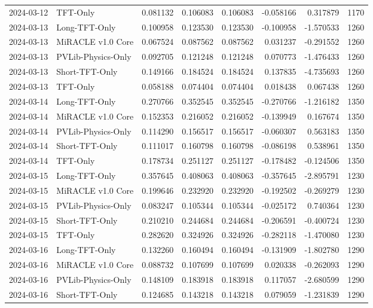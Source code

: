\begin{tabular}{llrrrrrr}
2024-03-12 & TFT-Only & 0.081132 & 0.106083 & 0.106083 & -0.058166 & 0.317879 & 1170 \\
2024-03-13 & Long-TFT-Only & 0.100958 & 0.123530 & 0.123530 & -0.100958 & -1.570533 & 1260 \\
2024-03-13 & MiRACLE v1.0 Core & 0.067524 & 0.087562 & 0.087562 & 0.031237 & -0.291552 & 1260 \\
2024-03-13 & PVLib-Physics-Only & 0.092705 & 0.121248 & 0.121248 & 0.070773 & -1.476433 & 1260 \\
2024-03-13 & Short-TFT-Only & 0.149166 & 0.184524 & 0.184524 & 0.137835 & -4.735693 & 1260 \\
2024-03-13 & TFT-Only & 0.058188 & 0.074404 & 0.074404 & 0.018438 & 0.067438 & 1260 \\
2024-03-14 & Long-TFT-Only & 0.270766 & 0.352545 & 0.352545 & -0.270766 & -1.216182 & 1350 \\
2024-03-14 & MiRACLE v1.0 Core & 0.152353 & 0.216052 & 0.216052 & -0.139949 & 0.167674 & 1350 \\
2024-03-14 & PVLib-Physics-Only & 0.114290 & 0.156517 & 0.156517 & -0.060307 & 0.563183 & 1350 \\
2024-03-14 & Short-TFT-Only & 0.111017 & 0.160798 & 0.160798 & -0.086198 & 0.538961 & 1350 \\
2024-03-14 & TFT-Only & 0.178734 & 0.251127 & 0.251127 & -0.178482 & -0.124506 & 1350 \\
2024-03-15 & Long-TFT-Only & 0.357645 & 0.408063 & 0.408063 & -0.357645 & -2.895791 & 1230 \\
2024-03-15 & MiRACLE v1.0 Core & 0.199646 & 0.232920 & 0.232920 & -0.192502 & -0.269279 & 1230 \\
2024-03-15 & PVLib-Physics-Only & 0.083247 & 0.105344 & 0.105344 & -0.025172 & 0.740364 & 1230 \\
2024-03-15 & Short-TFT-Only & 0.210210 & 0.244684 & 0.244684 & -0.206591 & -0.400724 & 1230 \\
2024-03-15 & TFT-Only & 0.282620 & 0.324926 & 0.324926 & -0.282118 & -1.470080 & 1230 \\
2024-03-16 & Long-TFT-Only & 0.132260 & 0.160494 & 0.160494 & -0.131909 & -1.802780 & 1290 \\
2024-03-16 & MiRACLE v1.0 Core & 0.088732 & 0.107699 & 0.107699 & 0.020338 & -0.262093 & 1290 \\
2024-03-16 & PVLib-Physics-Only & 0.148109 & 0.183918 & 0.183918 & 0.117057 & -2.680599 & 1290 \\
2024-03-16 & Short-TFT-Only & 0.124685 & 0.143218 & 0.143218 & 0.079059 & -1.231839 & 1290 \\

\end{tabular}
